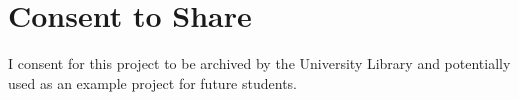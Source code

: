 \section*{Consent to Share}
I consent for this project to be archived by the University
Library and potentially used as an example project for future students.